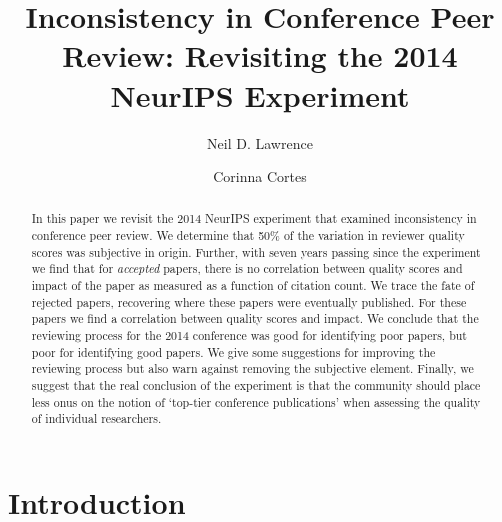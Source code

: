 \documentclass[twoside]{article}
\title{Inconsistency in Conference Peer Review: Revisiting the 2014 NeurIPS Experiment}
\author[$\dagger$]{Neil D. Lawrence}
\author[$\star$]{Corinna Cortes}
\affil[$\dagger$]{Computer Lab, University of Cambridge}
\affil[$\star$]{Google Research, New York}
\begin{document}
\maketitle

%

%

%

\begin{abstract}
    In this paper we revisit the 2014 NeurIPS experiment that examined
inconsistency in conference peer review. We determine that 50\% of the variation
in reviewer quality scores was subjective in origin. Further, with seven years
passing since the experiment we find that for \emph{accepted} papers,
there is no correlation between quality scores and impact of the paper
as measured as a function of citation count. We trace the fate of
rejected papers, recovering where these papers were eventually
published. For these papers we find a correlation between quality scores
and impact. We conclude that the reviewing process for the 2014
conference was good for identifying poor papers, but poor for
identifying good papers. We give some suggestions for improving the
reviewing process but also warn against removing the subjective element.
Finally, we suggest that the real conclusion of the experiment is that
the community should place less onus on the notion of `top-tier
conference publications' when assessing the quality of individual
researchers.
\end{abstract}

\hypertarget{introduction}{%
\section{Introduction}\label{introduction}}
\end{document}
